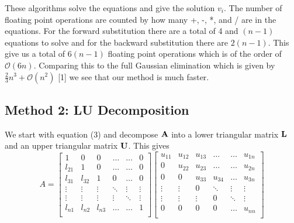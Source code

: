 \documentclass[11pt,a4wide]{article}
\begin{document}
These algorithms solve the equations and give the solution $v_i$. The number of floating point operations are counted by how many +, -, *, and / are in the equations. For the forward substitution there are a total of 4 and $(n-1)$ equations to solve and for the backward substitution there are $2(n-1)$. This give us a total of $6(n-1)$ floating point operations which is of the order of $\mathcal{O}(6n)$. Comparing this to the full Gaussian elimination which is given by $\frac{2}{3}n^3 +\mathcal{O}(n^2)$ [1] we see that our method is much faster. 

\subsection{Method 2: LU Decomposition}
We start with equation (3) and decompose  ${\bf A}$ into a lower triangular matrix ${\bf L}$ and an upper triangular matrix ${\bf U}$. This gives 
\begin{equation}
 A = \left[\begin{array}{cccccc}
                           1& 0& 0& \dots& \dots& 0\\ 
                           l_{21}& 1& 0& \dots& \dots& 0\\
                           l_{31}& l_{32}& 1& 0& \dots& 0\\   
                           \vdots& \vdots& \vdots& \ddots& \vdots& \vdots\\                        
                           \vdots& \vdots& \vdots& \vdots& \ddots& \vdots\\
                           l_{n1}& l_{n2}& l_{n3}& \dots& \dots& 1\\
                      \end{array} \right]                      
   \left[\begin{array}{cccccc}
                           u_{11}& u_{12}& u_{13}& \dots& \dots& u_{1n}\\ 
                           0& u_{22}& u_{23}& \dots& \dots& u_{2n}\\
                           0& 0& u_{33}& u_{34}& \dots& u_{3n}\\   
                           \vdots& \vdots& 0& \ddots& \vdots& \vdots\\                        
                           \vdots& \vdots& \vdots& 0& \ddots& \vdots\\
                           0& 0& 0& 0& \dots& u_{nn}\\
                      \end{array}\right]
\end{equation}
\end{document}
